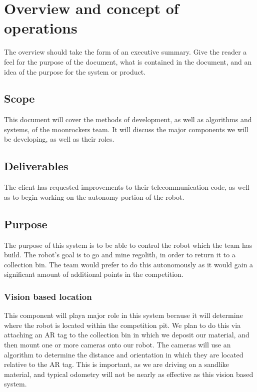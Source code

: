 
\chapter{Overview and concept of operations}

The overview should take the form of an executive summary.  Give the reader a feel 
for the purpose of the document, what is contained in the document, and an idea 
of the purpose for the system or product. 


\section{Scope}
This document will cover the methods of development, as well as algorithms and systems, of the moonrockers team. It will discuss the major components we will be developing, as well as their roles.

\section{Deliverables}

The client has requested improvements to their telecommunication code, as well as to begin working on the autonomy portion of the robot.

\section{Purpose}
The purpose of this system is to be able to control the robot which the team has build. The robot's goal is to go and mine regolith, in order to return it to a collection bin. The team would prefer to do this autonomously as it would gain a significant amount of additional points in the competition.


\subsection{Vision based location}
This component will playa major role in this system because it will determine where the robot is located within the competition pit. We plan to do this via attaching an AR tag to the collection bin in which we deposit our material, and then mount one or more cameras onto our robot. The cameras will use an algorithm to determine the distance and orientation in which they are located relative to the AR tag. This is important, as we are driving on a sandlike material, and typical odometry will not be nearly as effective as this vision based system.

